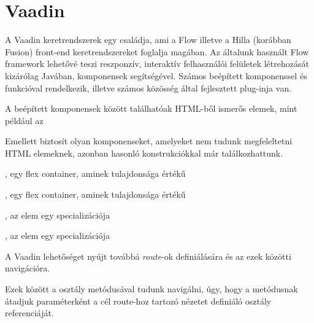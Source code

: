 \section{Vaadin}

A Vaadin keretrendszerek egy családja, ami a Flow illetve a Hilla (korábban Fusion) front-end keretrendszereket foglalja magában. Az általunk használt Flow framework lehetővé teszi reszponzív, interaktív felhasználói felületek létrehozását kizárólag Javában, komponensek segítségével. Számos beépített komponenssel és funkcióval rendelkezik, illetve számos közösség által fejlesztett plug-inja van. \par

A beépített komponensek között találhatóak HTML-ből ismerős elemek, mint például az

\begin{listing}
	\item {}
	\item {}
	\item {}
	\item {}
	\item {}
	\item {}
\end{listing}

Emellett biztosít olyan komponenseket, amelyeket nem tudunk megfeleltetni HTML elemeknek, azonban hasonló konstrukciókkal már találkozhattunk.

\begin{listing}
	\item {}, egy flex container, aminek  tulajdonsága  értékű 
	\item {}, egy flex container, aminek  tulajdonsága  értékű 
	\item {}, az  elem egy specializációja
	\item {}, az  elem egy specializációja
\end{listing}

A Vaadin lehetőséget nyújt továbbá \emph{route}-ok definiálására és az ezek közötti navigációra.


Ezek között a  osztály  metódusával tudunk navigálni, úgy, hogy a metódusnak átadjuk paraméterként a cél route-hoz tartozó nézetet definiáló osztály referenciáját.

